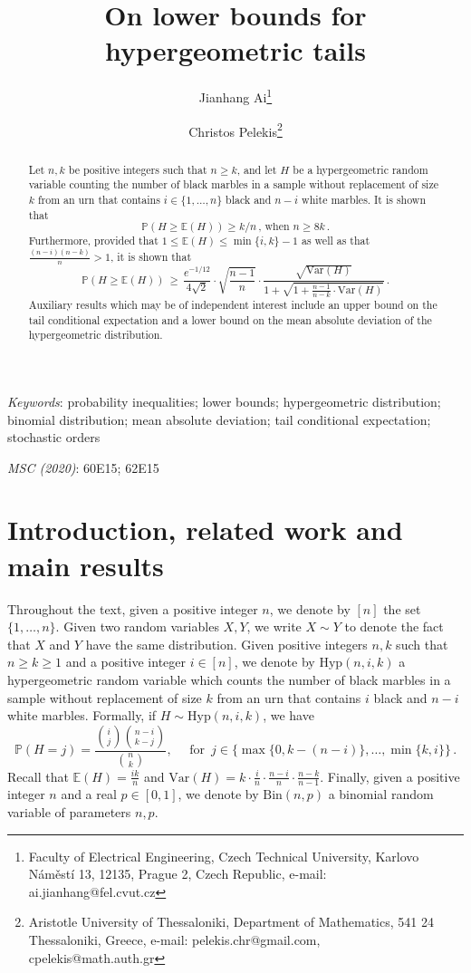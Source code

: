 \documentclass[10pt]{article}
\title{On lower bounds for hypergeometric tails}
\author{
Jianhang Ai\thanks{Faculty of Electrical Engineering, Czech Technical University, Karlovo N\'am\v{e}st\'i 13, 12135, Prague 2, Czech Republic, e-mail: ai.jianhang@fel.cvut.cz}
\and
Christos Pelekis\thanks{Aristotle University of Thessaloniki, 
Department of Mathematics, 
541 24 Thessaloniki, Greece, e-mail: pelekis.chr@gmail.com, \, cpelekis@math.auth.gr }
}
\theoremstyle{plain}
\theoremstyle{definition}
\theoremstyle{remark}
\newcommand{\Prb}{\mathbb{P}}
\newcommand{\Exp}{\mathbb{E}}
\begin{document}
\maketitle


\begin{abstract}  
Let $n,k$ be positive integers such that $n\geq k$, 
and let $H$ be a hypergeometric random variable counting the  number of black marbles in a sample without replacement of size $k$ from an urn that contains $i\in \{1,\ldots, n\}$
black and $n - i$ white marbles. 
It is shown that 
\[
\mathbb{P}(H \ge \mathbb{E}(H)) \ge k/n\, , \, \text{when} \,\,  n\ge 8k \, . 
\]
Furthermore, provided that $1\le \Exp(H)\le \min\{i,k\}-1$ as well as that $\frac{(n-i)(n-k)}{n}>1$, it is shown that  
\[
\mathbb{P}(H\ge \mathbb{E}(H)) \,\ge\, \frac{e^{-1/12}}{4\sqrt{2}} \cdot \sqrt{\frac{n-1}{n}} \cdot\frac{ \sqrt{\text{Var}(H)} }{1 + \sqrt{1+ \frac{n-1}{n-k}\cdot\text{Var}(H)}}\, .
\]
Auxiliary results which may be of independent interest include an upper bound on the tail conditional expectation and a  lower bound on the mean absolute deviation of the hypergeometric distribution. 

\end{abstract}


\noindent
\emph{Keywords}: probability inequalities; lower bounds; hypergeometric distribution; binomial distribution; mean absolute deviation; tail conditional expectation; stochastic orders 


\noindent
\emph{MSC (2020)}: 60E15;  62E15 

\section{Introduction, related work and main results} 

Throughout the text, given a positive integer $n$, we denote by $[n]$ the set $\{1,\ldots,n\}$. Given two random variables $X,Y$, we write  $X\sim Y$  to denote the fact that $X$ and $Y$ have the same distribution.
Given positive integers 
$n,k$ such that $n\ge k\ge 1$ and a positive integer $i\in [n]$, we denote by $\text{Hyp}(n,i,k)$ a hypergeometric random variable which counts the number of black marbles in a sample without replacement of size $k$ from an urn that contains $i$
black and $n - i$ white marbles. 
Formally, if $H\sim\text{Hyp}(n,i,k)$, we have   
\[
\Prb(H=j)=\frac{\binom{i}{j}\binom{n-i}{k-j}}{\binom{n}{k}},\quad \text{ for } \, 
j\in\{\max\{0,k-(n-i)\},\dots,\min\{k,i\}\} \, .
\]
Recall that $\Exp(H)= \frac{ik}{n}$ and $\text{Var}(H) = k\cdot\frac{i}{n}\cdot\frac{n-i}{n}\cdot\frac{n-k}{n-1}$. Finally, 
given a positive integer $n$ and a real $p\in [0,1]$, we denote by $\text{Bin}(n,p)$ a binomial random variable of parameters $n,p$. 
 
\end{document}
